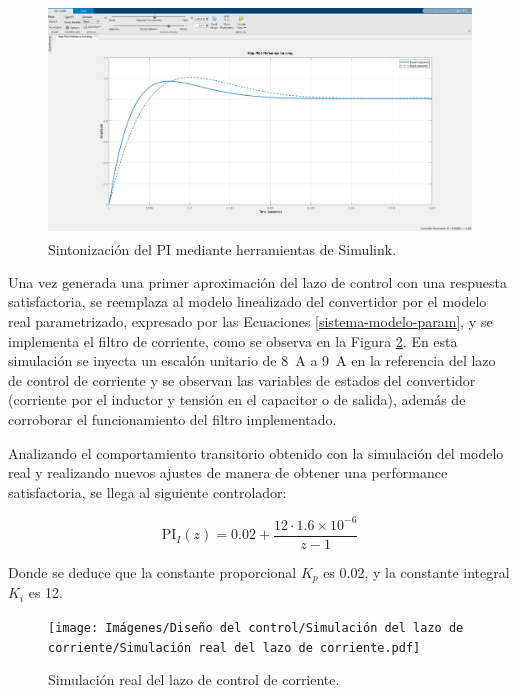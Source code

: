 \begin{figure}[hbt!]
  \centering
  \includegraphics[width=0.70\columnwidth]{Imágenes/Diseño del control/Simulación del lazo de corriente/Tuner de Simulink.png}
  \caption{Sintonización del PI mediante herramientas de Simulink\textsuperscript\textregistered.}
  \label{tuner-modelo-discretizado-corriente}
\end{figure} 

Una vez generada una primer aproximación del lazo de control con una respuesta satisfactoria, se reemplaza al modelo linealizado del convertidor por el modelo real parametrizado, expresado por las Ecuaciones \ref{sistema-modelo-param}, y se implementa el filtro de corriente, como se observa en la Figura \ref{simulacion-modelo-real-corriente}. En esta simulación se inyecta un escalón unitario de \SI{8}{\ampere} a \SI{9}{\ampere} en la referencia del lazo de control de corriente y se observan las variables de estados del convertidor (corriente por el inductor y tensión en el capacitor o de salida), además de corroborar el funcionamiento del filtro implementado.

Analizando el comportamiento transitorio obtenido con la simulación del modelo real y realizando nuevos ajustes de manera de obtener una performance satisfactoria, se llega al siguiente controlador:

\begin{equation*}
  \boxed{\mathrm{PI}_I (z) = 0.02 + \frac{12 \cdot 1.6 \times 10^{-6}}{z-1}}
\end{equation*}

Donde se deduce que la constante proporcional $K_p$ es 0.02, y la constante integral $K_i$ es 12.

\begin{figure}[hbt!]
  \centering
  \texttt{[image: Imágenes/Diseño del control/Simulación del lazo de corriente/Simulación real del lazo de corriente.pdf]}
  \caption{Simulación real del lazo de control de corriente.}
  \label{simulacion-modelo-real-corriente}
\end{figure} 

